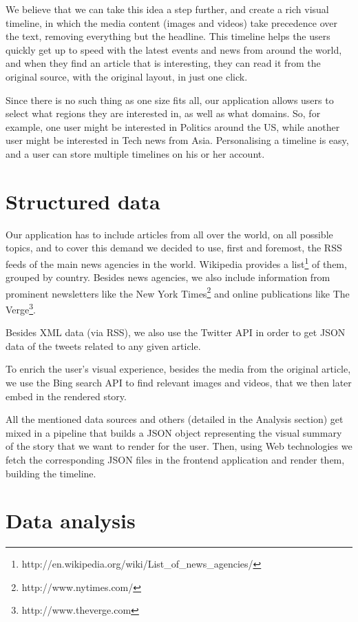 \documentclass{acm_proc_10ptArticle-sp}
\begin{document}
We believe that we can take this idea a step further, and create a rich visual timeline, in which the media content (images and videos) take precedence over the text, removing everything but the headline. This timeline helps the users quickly get up to speed with the latest events and news from around the world, and when they find an article that is interesting, they can read it from the original source, with the original layout, in just one click.

Since there is no such thing as one size fits all, our application allows users to select what regions they are interested in, as well as what domains. So, for example, one user might be interested in Politics around the US, while another user might be interested in Tech news from Asia. Personalising a timeline is easy, and a user can store multiple timelines on his or her account.

\section{Structured data}

Our application has to include articles from all over the world, on all possible topics, and to cover this demand we decided to use, first and foremost, the RSS feeds of the main news agencies in the world. Wikipedia provides a list\footnote{http://en.wikipedia.org/wiki/List\_of\_news\_agencies/} of them, grouped by country. Besides news agencies, we also include information from prominent newsletters like the New York Times\footnote{http://www.nytimes.com/} and online publications like The Verge\footnote{http://www.theverge.com}.

Besides XML data (via RSS), we also use the Twitter API in order to get JSON data of the tweets related to any given article.

To enrich the user’s visual experience, besides the media from the original article, we use the Bing search API to find relevant images and videos, that we then later embed in the rendered story.

All the mentioned data sources and others (detailed in the Analysis section) get mixed in a pipeline that builds a JSON object representing the visual summary of the story that we want to render for the user. Then, using Web technologies we fetch the corresponding JSON files in the frontend application and render them, building the timeline.

\section{Data analysis}
\end{document}
